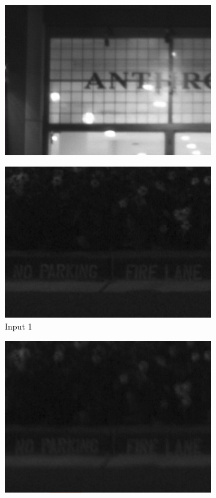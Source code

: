 \documentclass[a4paper,10pt]{report}
\begin{document}
\begin{figure}[h]
\begin{subfigure}{0.32\textwidth}
    \includegraphics[width=0.9\linewidth]{ressource/detail_anthro_res.png} 
    \label{fig:anthro_result}
  \end{subfigure}
  \begin{subfigure}{0.32\textwidth}
    \includegraphics[width=0.9\linewidth]{ressource/detail_fire1.png} 
    \caption{Input 1}
    \label{fig:fire1}
  \end{subfigure}
  \begin{subfigure}{0.32\textwidth}
    \includegraphics[width=0.9\linewidth]{ressource/detail_fire3.png} 

\end{subfigure}
\end{figure}
\end{document}
